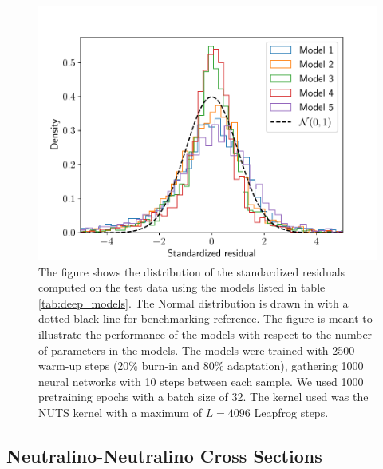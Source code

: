 \begin{figure}
    \centering
    \includegraphics[scale=0.8]{figures/standardized_residuals/standardized_residual_simple_models.pdf}
    \caption{
        The figure shows the distribution of the standardized residuals computed on the test data using the models listed in table \ref{tab:deep_models}. The Normal distribution is drawn in with a dotted black line for benchmarking reference.
        The figure is meant to illustrate the performance of the models with respect to the number of parameters in the models.
        The models were trained with 2500 warm-up steps (20\% burn-in and 80\% adaptation), gathering 1000 neural networks with 10 steps between each sample. We used 1000 pretraining epochs with a batch size of 32. The kernel used was the NUTS kernel with a maximum of $L = 4096$ Leapfrog steps. 
    }
    \label{fig:standardized_residual_vs_params}
\end{figure}


\subsection{Neutralino-Neutralino Cross Sections}\label{subsec:neuralino_experiments}
